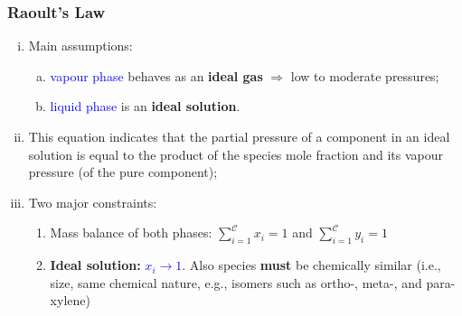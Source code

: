 \documentclass[10pt,compress,unknownkeysallowed]{beamer}
\begin{document}
\begin{frame}
  \frametitle{Raoult's Law}
  \begin{enumerate}[i)]
      \item<1-> Main assumptions:
         \begin{enumerate}[a)]
             \item<1-> \textcolor{blue}{vapour phase} behaves as an {\bf ideal gas} $\Longrightarrow$ low to moderate pressures;
             \item<1-> \textcolor{blue}{liquid phase} is an {\bf ideal solution}.
         \end{enumerate}
      \item<2-> This equation indicates that the partial pressure of a component in an ideal solution is equal to the product of the species mole fraction and its vapour pressure (of the pure component);
      \item<3-> Two major constraints:
         \begin{enumerate}
             \item<2-> Mass balance of both phases: $\sum\limits_{i=1}^{\mathcal{C}} x_{i} = 1$ and $\sum\limits_{i=1}^{\mathcal{C}} y_{i} = 1$
             \item<2-> {\bf Ideal solution:} \textcolor{blue}{$x_{i}\rightarrow 1$}. Also species {\bf must} be chemically similar (i.e., size, same chemical nature, e.g., isomers such as ortho-, meta-, and para-xylene) 
         \end{enumerate}
  \end{enumerate}
\end{frame}
\end{document}
